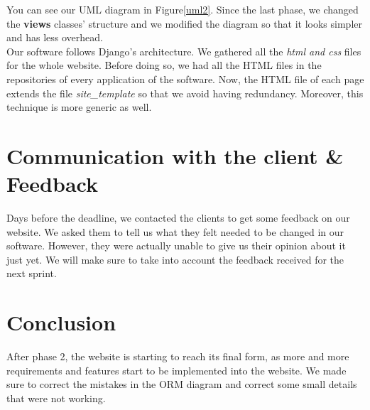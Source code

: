 \documentclass[a4paper, 12pt]{article}
\begin{document}
You can see our UML diagram in Figure\ref{uml2}. Since the last phase, we changed the \textbf{views} classes' structure and we modified the diagram so that it looks simpler and has less overhead.\\


Our software follows Django's architecture. We gathered all the \textit{html and css} files for the whole website. Before doing so, we had all the HTML files in the repositories of every application of the software. Now, the HTML file of each page extends the file \textit{site\_template} so that we avoid having redundancy. Moreover, this technique is more generic as well. \\
\newpage

\section{Communication with the client \& Feedback}
Days before the deadline, we contacted the clients to get some feedback on our website. We asked them to tell us what they felt needed to be changed in our software. However, they were actually unable to give us their opinion about it just yet. We will make sure to take into account the feedback received for the next sprint. \\

\section{Conclusion}
After phase 2, the website is starting to reach its final form, as more and more requirements and features start to be implemented into the website. We made sure to correct the mistakes in the ORM diagram and correct some small details that were not working. 
\end{document}
